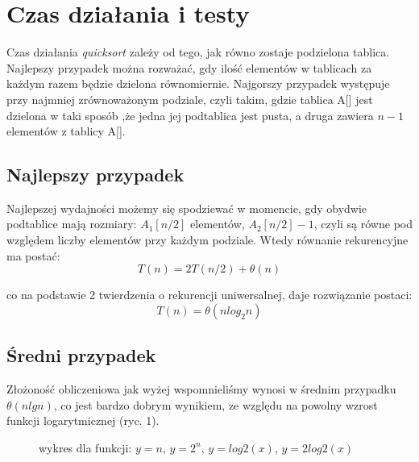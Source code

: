 \documentclass[a4paper,11pt]{report}
\begin{document}
\chapter{Czas działania i testy}
Czas działania \textit{quicksort} zależy od tego, jak równo zostaje podzielona tablica. Najlepszy przypadek można rozważać, gdy ilość elementów w tablicach za każdym razem będzie dzielona równomiernie. 
Najgorszy przypadek występuje przy najmniej zrównoważonym podziale, czyli takim, gdzie tablica A[] jest dzielona w taki sposób ,że jedna jej podtablica jest pusta, a druga zawiera $n-1$ elementów z tablicy A[].

\section{Najlepszy przypadek}
Najlepszej wydajności możemy się spodziewać w momencie, gdy obydwie podtablice mają rozmiary: $A_{1}[n/2]$ elementów,  $A_{2}[n/2] - 1$, czyli są  równe pod względem liczby elementów przy każdym podziale. Wtedy równanie rekurencyjne ma postać: \\

\begin{equation*}
T(n) = 2T(n/2) + \theta(n)
\end{equation*}

co na podstawie 2 twierdzenia o rekurencji uniwersalnej, daje rozwiązanie postaci: 
\begin{equation*}
T(n) = \theta(n log_{2} n)
\end{equation*}

\section{Średni przypadek}
Złożoność obliczeniowa jak wyżej wspomnieliśmy wynosi w średnim przypadku $\theta(nlgn)$, co jest bardzo dobrym wynikiem, ze względu na powolny wzrost funkcji logarytmicznej (ryc. 1).

\begin{figure}[h!]
\centering
{}
\caption{wykres dla funkcji: $y=n$, $y=2^n$, $y=log2(x)$, $y=2log2(x)$}
\end{figure}
\end{document}
